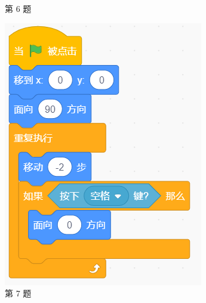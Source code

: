 \documentclass[10pt, a4paper]{article}
\begin{document}
\begin{enumerate}
\begin{figure}[htbp]
\begin{minipage}[t]{.4\textwidth}
\begin{minipage}[t]{.42\textwidth}
                \end{minipage}
                \caption*{第 6 题}
            \end{minipage}
            \begin{minipage}[t]{.18\textwidth}
                \centering
                \includegraphics[width=\textwidth]{7.png}
                \caption*{第 7 题}
            \end{minipage}
            \begin{minipage}[t]{.25\textwidth}
                \centering

\end{minipage}
\end{figure}
\end{enumerate}
\end{document}
